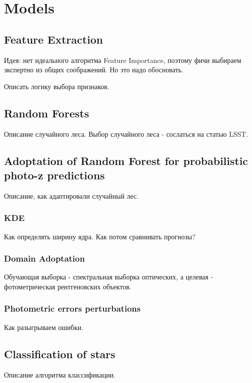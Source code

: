 \section{Models}\label{sec:algos}

\subsection{Feature Extraction}

Идея: нет идеального алгоритма Feature Importance, поэтому фичи выбираем экспертно из общих соображений. Но это надо обосновать.

Описать логику выбора признаков.


\subsection{Random Forests}
Описание случайного леса. Выбор случайного леса - сослаться на статью LSST.

\subsection{Adoptation of Random Forest for probabilistic photo-z predictions}
Описание, как адаптировали случайный лес.

\subsubsection{KDE}
Как определять ширину ядра. Как потом сравнивать прогнозы?

\subsubsection{Domain Adoptation}
Обучающая выборка - спектральная выборка оптических, а целевая - фотометрическая рентгеновских объектов.

\subsubsection{Photometric errors perturbations}

Как разыгрываем ошибки.

\subsection{Classification of stars}
Описание алгоритма классификации.
